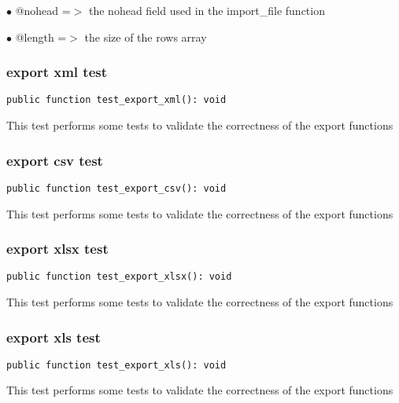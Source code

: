 \documentclass[a4paper]{article}
\begin{document}
\begin{compactitem}
\item[\color{myblue}$\bullet$] @nohead =$>$ the nohead field used in the import\_file function
\item[\color{myblue}$\bullet$] @length =$>$ the size of the rows array
\end{compactitem}

\hypertarget{toc175}{}
\subsubsection{export xml test}

\begin{lstlisting}
public function test_export_xml(): void
\end{lstlisting}

This test performs some tests to validate the correctness
of the export functions

\hypertarget{toc176}{}
\subsubsection{export csv test}

\begin{lstlisting}
public function test_export_csv(): void
\end{lstlisting}

This test performs some tests to validate the correctness
of the export functions

\hypertarget{toc177}{}
\subsubsection{export xlsx test}

\begin{lstlisting}
public function test_export_xlsx(): void
\end{lstlisting}

This test performs some tests to validate the correctness
of the export functions

\hypertarget{toc178}{}
\subsubsection{export xls test}

\begin{lstlisting}
public function test_export_xls(): void
\end{lstlisting}

This test performs some tests to validate the correctness
of the export functions
\end{document}
